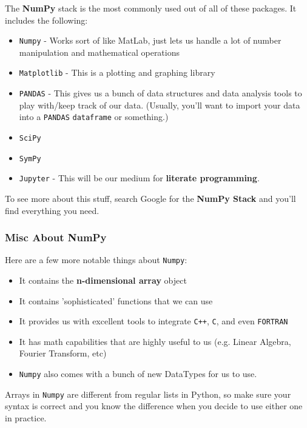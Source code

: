 \documentclass[english, 10pt]{article}
\begin{document}
The \textbf{NumPy} stack is the most commonly used out of all of these packages. It includes the following:

\begin{itemize}
	\item \texttt{Numpy} - Works sort of like MatLab, just lets us handle a lot of number manipulation and mathematical operations
	\item \texttt{Matplotlib} - This is a plotting and graphing library
	\item \texttt{PANDAS} - This gives us a bunch of data structures and data analysis tools to play with/keep track of our data. (Usually, you'll want to import your data into a \texttt{PANDAS} \texttt{dataframe} or something.)
	\item \texttt{SciPy}
	\item \texttt{SymPy}
	\item \texttt{Jupyter} - This will be our medium for \textbf{literate programming}.
\end{itemize}

To see more about this stuff, search Google for the \textbf{NumPy Stack} and you'll find everything you need.

\subsubsection{Misc About NumPy}

Here are a few more notable things about \texttt{Numpy}:

\begin{itemize}
	\item It contains the \textbf{n-dimensional array} object
	\item It contains 'sophisticated' functions that we can use
	\item It provides us with excellent tools to integrate \texttt{C++}, \texttt{C}, and even \texttt{FORTRAN}
	\item It has math capabilities that are highly useful to us (e.g. Linear Algebra, Fourier Transform, etc)
	\item \texttt{Numpy} also comes with a bunch of new DataTypes for us to use.
\end{itemize}

\begin{tcolorbox}[title=Aside: Numpy Arrays,colframe=black,colback=white,arc=0pt,fonttitle=\bfseries]
Arrays in \texttt{Numpy} are different from regular lists in Python, so make sure your syntax is correct and you know the difference when you decide to use either one in practice.
\end{tcolorbox}
\end{document}
